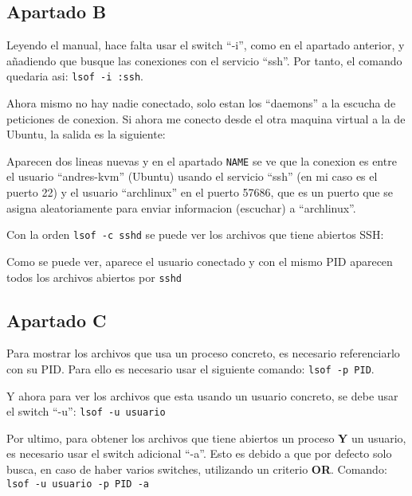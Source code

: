 \documentclass{article}
\begin{document}
\subsection*{Apartado B}
Leyendo el manual, hace falta usar el switch ``-i'', como en el apartado anterior, y añadiendo que busque las conexiones con el servicio ``ssh''. Por tanto, el comando quedaria asi: \verb|lsof -i :ssh|.


Ahora mismo no hay nadie conectado, solo estan los ``daemons'' a la escucha de peticiones de conexion. Si ahora me conecto desde el otra maquina virtual a la de Ubuntu, la salida es la siguiente:


Aparecen dos lineas nuevas y en el apartado \verb|NAME| se ve que la conexion es entre el usuario ``andres-kvm'' (Ubuntu) usando el servicio ``ssh'' (en mi caso es el puerto 22)  y el usuario ``archlinux'' en el puerto 57686, que es un puerto que se asigna aleatoriamente para enviar informacion (escuchar) a ``archlinux''.

Con la orden \verb|lsof -c sshd| se puede ver los archivos que tiene abiertos SSH:


Como se puede ver, aparece el usuario conectado y con el mismo PID aparecen todos los archivos abiertos por \verb|sshd|


\subsection*{Apartado C}
Para mostrar los archivos que usa un proceso concreto, es necesario referenciarlo con su PID. Para ello es necesario usar el siguiente comando: \verb|lsof -p PID|.


Y ahora para ver los archivos que esta usando un usuario concreto, se debe usar el switch ``-u'': \verb|lsof -u usuario|


Por ultimo, para obtener los archivos que tiene abiertos un proceso \textbf{Y} un usuario, es necesario usar el switch adicional ``-a''. Esto es debido a que por defecto solo busca, en caso de haber varios switches, utilizando un criterio \textbf{OR}. Comando: \verb|lsof -u usuario -p PID -a|

\end{document}
